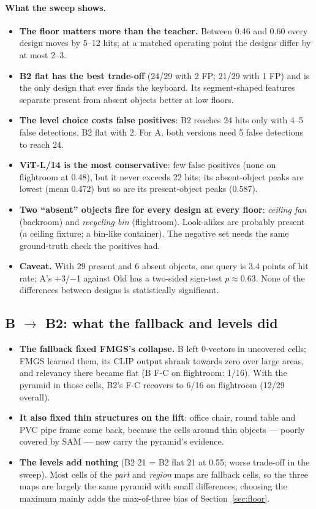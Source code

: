 \documentclass[11pt,a4paper]{article}
\begin{document}
\paragraph{What the sweep shows.}
\begin{itemize}
  \item \textbf{The floor matters more than the teacher.} Between 0.46 and 0.60 every design moves by 5--12 hits; at a
        matched operating point the designs differ by at most 2--3.
  \item \textbf{B2 flat has the best trade-off} (24/29 with 2 FP; 21/29 with 1 FP) and is the only design that ever
        finds the keyboard. Its segment-shaped features separate present from absent objects better at low floors.
  \item \textbf{The level choice costs false positives}: B2 reaches 24 hits only with 4--5 false detections, B2 flat with 2.
        For A, both versions need 5 false detections to reach 24.
  \item \textbf{ViT-L/14 is the most conservative}: few false positives (none on flightroom at 0.48), but it never exceeds
        22 hits; its absent-object peaks are lowest (mean 0.472) but so are its present-object peaks (0.587).
  \item \textbf{Two ``absent'' objects fire for every design at every floor}: \emph{ceiling fan} (backroom) and
        \emph{recycling bin} (flightroom). Look-alikes are probably present (a ceiling fixture; a bin-like container).
        The negative set needs the same ground-truth check the positives had.
  \item \textbf{Caveat.} With 29 present and 6 absent objects, one query is 3.4 points of hit rate; A's +3/$-$1 against Old
        has a two-sided sign-test $p\approx0.63$. None of the differences between designs is statistically significant.
\end{itemize}

\subsection{B $\rightarrow$ B2: what the fallback and levels did}
\begin{itemize}
  \item \textbf{The fallback fixed FMGS's collapse.} B left 0-vectors in uncovered cells; FMGS learned them, its CLIP
        output shrank towards zero over large areas, and relevancy there became flat (B F-C on flightroom: 1/16). With the
        pyramid in those cells, B2's F-C recovers to 6/16 on flightroom (12/29 overall).
  \item \textbf{It also fixed thin structures on the lift}: office chair, round table and PVC pipe frame come back,
        because the cells around thin objects --- poorly covered by SAM --- now carry the pyramid's evidence.
  \item \textbf{The levels add nothing} (B2 21 = B2 flat 21 at 0.55; worse trade-off in the sweep). Most cells of the
        \emph{part} and \emph{region} maps are fallback cells, so the three maps are largely the same pyramid with small
        differences; choosing the maximum mainly adds the max-of-three bias of Section~\ref{sec:floor}.
\end{itemize}
\end{document}
